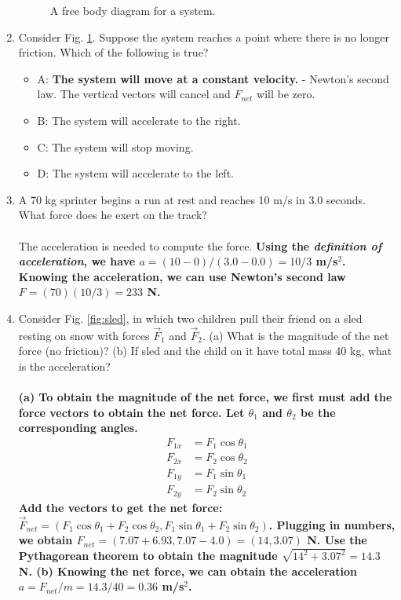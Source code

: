 \documentclass[10pt]{article}
\begin{document}
\begin{enumerate}
\begin{figure}[h]
\caption{\label{fig:fbd1} A free body diagram for a system.}
\end{figure}
\item Consider Fig. \ref{fig:fbd1}.  Suppose the system reaches a point where there is no longer friction.  Which of the following is true?
\begin{itemize}
\item A: \textbf{The system will move at a constant velocity.} - Newton's second law.  The vertical vectors will cancel and $F_{net}$ will be zero.
\item B: The system will accelerate to the right.
\item C: The system will stop moving.
\item D: The system will accelerate to the left.
\end{itemize}
\item A 70 kg sprinter begins a run at rest and reaches 10 m/s in 3.0 seconds.  What force does he exert on the track? \\ \\
The acceleration is needed to compute the force.  \textbf{Using the \textit{definition of acceleration}, we have $a = (10-0)/(3.0-0.0) = 10/3$ m/s$^2$. Knowing the acceleration, we can use Newton's second law $F = (70)(10/3) = 233$ N.}
\item Consider Fig. \ref{fig:sled}, in which two children pull their friend on a sled resting on snow with forces $\vec{F}_1$ and $\vec{F}_2$.  (a) What is the magnitude of the net force (no friction)? (b) If sled and the child on it have total mass 40 kg, what is the acceleration? \\ \\ 
\textbf{(a) To obtain the magnitude of the net force, we first must add the force vectors to obtain the net force.  Let $\theta_1$ and $\theta_2$ be the corresponding angles.} \\
\begin{align}
F_{1x} &= F_1 \cos\theta_1 \\
F_{2x} &= F_2 \cos\theta_2 \\
F_{1y} &= F_1 \sin\theta_1 \\
F_{2y} &= F_2 \sin\theta_2
\end{align}
\textbf{Add the vectors to get the net force: $\vec{F}_{net} = (F_1 \cos\theta_1+F_2 \cos\theta_2,F_1\sin\theta_1+F_2 \sin\theta_2)$.  Plugging in numbers, we obtain $F_{net} = (7.07+6.93,7.07-4.0) = (14,3.07)$ N. Use the Pythagorean theorem to obtain the magnitude $\sqrt{14^2+3.07^2} = 14.3$ N.  (b) Knowing the net force, we can obtain the acceleration $a = F_{net}/m = 14.3/40 = 0.36$ m/s$^2$.}

\end{enumerate}
\end{document}
